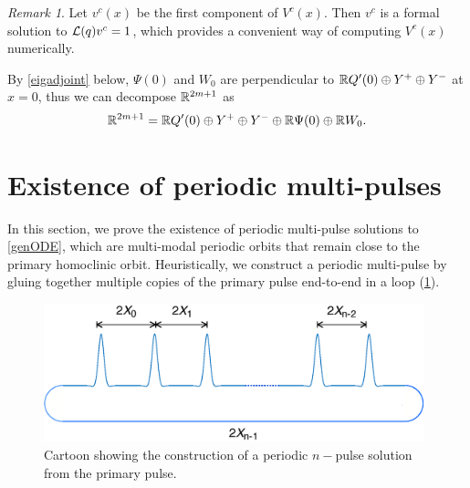 \documentclass[12pt]{elsarticle}
\theoremstyle{plain}
\theoremstyle{definition}
\theoremstyle{remark}
\newtheorem{remark}[theorem]{Remark}
\numberwithin{theorem}{section}
\numberwithin{equation}{section}
\begin{document}
\begin{remark}\label{remark:computeVc}
Let $v^c(x)$ be the first component of $V^c(x)$. Then $v^c$ is a formal solution to $\mathcal{L}(q) v^c = 1$, which provides a convenient way of computing $V^c(x)$ numerically.
\end{remark}

\noi By \cref{eigadjoint} below, $\Psi(0)$ and $W_0$ are perpendicular to $\mathbb{R} Q'(0) \oplus Y^+ \oplus Y^-$ at $x = 0$, thus we can decompose $\mathbb{R}^{2m+1}$ as 
\begin{equation}\label{DSdecomp}
\mathbb{R}^{2m+1} = \mathbb{R} Q'(0) \oplus Y^+ \oplus Y^- \oplus \mathbb{R} \Psi(0) \oplus \mathbb{R} W_0.
\end{equation}

\section{Existence of periodic multi-pulses}\label{sec:perexist}

In this section, we prove the existence of periodic multi-pulse solutions to \cref{genODE}, which are multi-modal periodic orbits that remain close to the primary homoclinic orbit. Heuristically, we construct a periodic multi-pulse by gluing together multiple copies of the primary pulse end-to-end in a loop (\cref{fig:permultipulse}).

\begin{figure}
\begin{center}
\includegraphics[width=11cm]{images/multipulseperiodic}
\end{center}
\caption{Cartoon showing the construction of a periodic $n-$pulse solution from the primary pulse.}
\label{fig:permultipulse}
\end{figure}
\end{document}
